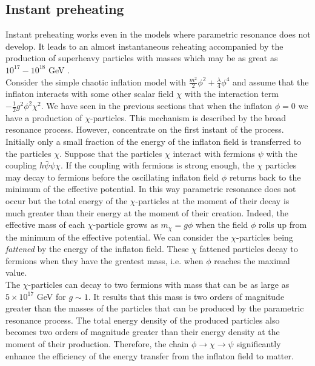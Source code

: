 \documentclass[11pt,a4paper,twoside]{book}
\begin{document}
\subsection{Instant preheating}
Instant preheating works even in the models where parametric resonance does not develop. It leads to an almost instantaneous reheating accompanied by the production of superheavy particles with masses which may be as great as $ 10^{17}-10^{18} $ GeV \cite{Chap4:InstantPreheating}.\\
Consider the simple chaotic inflation model with $ \frac{m^{2}}{2}\phi^{2}+ \frac{\lambda}{4}\phi^{4} $ and assume that the inflaton interacts with some other scalar field $\chi$ with the interaction term $ -\frac{1}{2}g^{2}\phi^{2}\chi^{2} $. We have seen in the previous sections that when the inflaton $\phi=0$ we have a production of $\chi$-particles. This mechanism is described by the broad resonance process. However, concentrate on the first instant of the process. Initially only a small fraction of the energy of the inflaton field is transferred to the particles $\chi$. Suppose that the particles $\chi$ interact with fermions $\psi$ with the coupling $ h\bar{\psi}\psi\chi $. If the coupling with fermions is strong enough, the $\chi$ particles may decay to fermions before the oscillating inflaton field $\phi$ returns back to the minimum of the effective potential. In this way parametric resonance does not occur but the total energy of the $\chi$-particles at the moment of their decay is much greater than their energy at the moment of their creation. Indeed, the effective mass of each $\chi$-particle grows as $ m_{\chi}=g\phi $ when the field $\phi$ rolls up from the minimum of the effective potential. We can consider the $\chi$-particles being \textit{fattened} by the energy of the inflaton field. These $\chi$ fattened particles decay to fermions when they have the greatest mass, i.e. when $\phi$ reaches the maximal value.\\
The $\chi$-particles can decay to two fermions with mass that can be as large as $ 5 \times 10^{17}$ GeV  for $ g \sim 1 $. It results that this mass is two orders of magnitude greater than the masses of the particles that can be produced by the parametric resonance process. The total energy density of the produced particles also becomes two orders of magnitude greater than their energy density at the moment of their production. Therefore, the chain $ \phi \rightarrow \chi \rightarrow \psi  $ significantly enhance the efficiency of the energy transfer from the inflaton field to matter.\\
\end{document}
